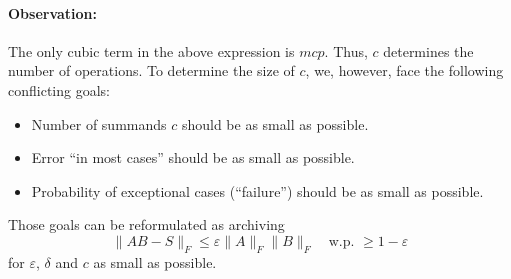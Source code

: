 \paragraph{Observation:} The only cubic term in the above expression is $m c  p$. Thus, $c$ determines the number of operations. To determine the size of $c$, we, however, face the following conflicting goals: \vspace{-0.5pc}
\begin{itemize}[-,itemsep=0pt]
	\item Number of summands $c$ should be as small as possible.
	\item Error ``in most cases'' should be as small as possible.
	\item Probability of exceptional cases (``failure'') should be as small as possible.
\end{itemize}
Those goals can be reformulated as archiving 
\begin{equation}
\|AB-S\|_F \leq \varepsilon \|A\|_F \|B\|_F \quad \text{w.p. } \geq 1-\varepsilon
\end{equation}
for $\varepsilon$, $\delta$ and $c$ as small as possible.
